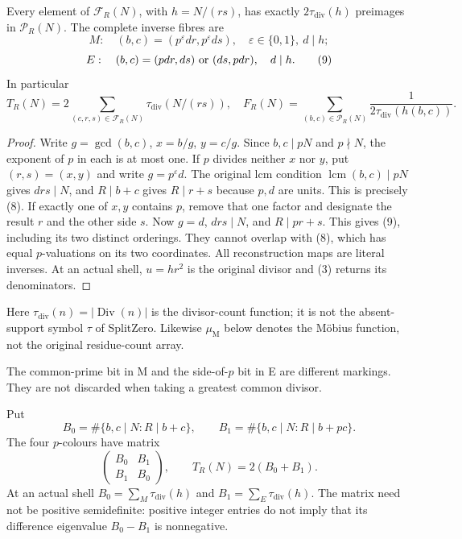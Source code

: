 \begin{theorem}\label{thm:fibre}
Every element of $\mathcal F_R(N)$, with $h=N/(rs)$, has exactly
$2\tau_{\mathrm{div}}(h)$ preimages in $\mathcal P_R(N)$. The complete inverse fibres are
\[
 M:\quad (b,c)=(p^\varepsilon dr,p^\varepsilon ds),\quad
 \varepsilon\in\{0,1\},\ d\mid h;                         \tag{8}
\]
\[
 E:\quad (b,c)=(pdr,ds)\ \hbox{or}\ (ds,pdr),\quad d\mid h. \tag{9}
\]
In particular
\[
 T_R(N)=2\sum_{(c,r,s)\in\mathcal F_R(N)}\tau_{\mathrm{div}}(N/(rs)),
\quad
 F_R(N)=\sum_{(b,c)\in\mathcal P_R(N)}\frac1{2\tau_{\mathrm{div}}(h(b,c))}. \tag{10}
\]
\end{theorem}
\begin{proof}
Write $g=\gcd(b,c)$, $x=b/g$, $y=c/g$. Since $b,c\mid pN$ and $p\nmid N$,
the exponent of $p$ in each is at most one. If $p$ divides neither $x$ nor $y$,
put $(r,s)=(x,y)$ and write $g=p^\varepsilon d$. The original lcm condition
$\operatorname{lcm}(b,c)\mid pN$ gives $drs\mid N$, and $R\mid b+c$ gives
$R\mid r+s$ because $p,d$ are units. This is precisely (8).
If exactly one of $x,y$ contains $p$, remove that one factor and designate the
result $r$ and the other side $s$. Now $g=d$, $drs\mid N$, and $R\mid pr+s$.
This gives (9), including its two distinct orderings. They cannot overlap with
(8), which has equal $p$-valuations on its two coordinates. All reconstruction
maps are literal inverses. At an actual shell, $u=hr^2$ is the original divisor
and (3) returns its denominators.
\end{proof}
Here $\tau_{\mathrm{div}}(n)=|\operatorname{Div}(n)|$ is the divisor-count function; it is not the absent-support symbol $\tau$ of SplitZero. Likewise $\mu_{\mathrm M}$ below denotes the M\"obius function, not the original residue-count array.

The common-prime bit in M and the side-of-$p$ bit in E are different markings.
They are not discarded when taking a greatest common divisor.

Put
\[
 B_0=\#\{b,c\mid N:R\mid b+c\},\qquad
 B_1=\#\{b,c\mid N:R\mid b+pc\}.
\]
The four $p$-colours have matrix
\[
 \begin{pmatrix}B_0&B_1\\B_1&B_0\end{pmatrix},\qquad
 T_R(N)=2(B_0+B_1).                                      \tag{11}
\]
At an actual shell $B_0=\sum_M\tau_{\mathrm{div}}(h)$ and $B_1=\sum_E\tau_{\mathrm{div}}(h)$. The matrix
need not be positive semidefinite: positive integer entries do not imply that
its difference eigenvalue $B_0-B_1$ is nonnegative.

